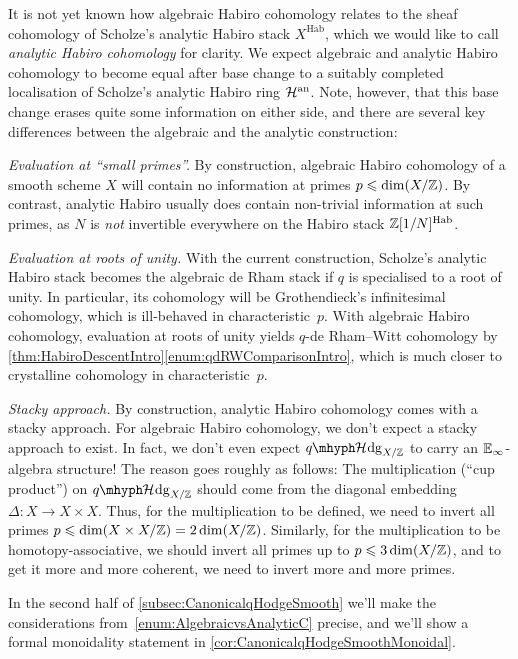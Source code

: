 \documentclass[DIV=12,numbers=enddot,leqno,bibliography=totoc]{scrartcl}
\begin{document}
	\begin{numpar}\label{par:AlgebraicvsAnalytic}
		It is not yet known how algebraic Habiro cohomology relates to the sheaf cohomology of Scholze's analytic Habiro stack $X^\mathrm{Hab}$, which we would like to call \emph{analytic Habiro cohomology} for clarity. We expect algebraic and analytic Habiro cohomology to become equal after base change to a suitably completed localisation of Scholze's analytic Habiro ring $\mathcal{H}^\mathrm{an}$. Note, however, that this base change erases quite some information on either side, and there are several key differences between the algebraic and the analytic construction:
		\begin{alphanumerate}
			\item \emph{Evaluation at \enquote{small primes}.} By construction, algebraic Habiro cohomology of a smooth scheme $X$ will contain no information at primes $p\leqslant \dim(X/\mathbb{Z})$. By contrast, analytic Habiro usually does contain non-trivial information at such primes, as $N$ is \emph{not} invertible everywhere on the Habiro stack $\mathbb{Z}[1/N]^\mathrm{Hab}$.
			\item \emph{Evaluation at roots of unity.} With the current construction, Scholze's analytic Habiro stack becomes the algebraic de Rham stack if $q$ is specialised to a root of unity. In particular, its cohomology will be Grothendieck's infinitesimal cohomology, which is ill-behaved in characteristic~$p$. With algebraic Habiro cohomology, evaluation at roots of unity yields $q$-de Rham--Witt cohomology by \cref{thm:HabiroDescentIntro}\cref{enum:qdRWComparisonIntro}, which is much closer to crystalline cohomology in characteristic~$p$.
			\item \emph{Stacky approach.} By construction, analytic Habiro cohomology comes with a stacky approach. For algebraic Habiro cohomology, we don't expect a stacky approach to exist. In fact, we don't even expect $\qHhodge_{X/\IZ}$ to carry an $\mathbb{E}_\infty$-algebra structure! The reason goes roughly as follows: The multiplication (\enquote{cup product}) on $\qHhodge_{X/\IZ}$ should come from the diagonal embedding $\Delta\colon X\rightarrow X\times X$. Thus, for the multiplication to be defined, we need to invert all primes $p\leqslant \dim(X\times X/\mathbb{Z})=2\dim(X/\mathbb{Z})$. Similarly, for the multiplication to be homotopy-associative, we should invert all primes up to $p\leqslant 3\dim(X/\mathbb{Z})$, and to get it more and more coherent, we need to invert more and more primes.\label{enum:AlgebraicvsAnalyticC}
		\end{alphanumerate}
		In the second half of \cref{subsec:CanonicalqHodgeSmooth} we'll make the considerations from~\cref{enum:AlgebraicvsAnalyticC} precise, and we'll show a formal monoidality statement in \cref{cor:CanonicalqHodgeSmoothMonoidal}.
	\end{numpar}
	
\end{document}
